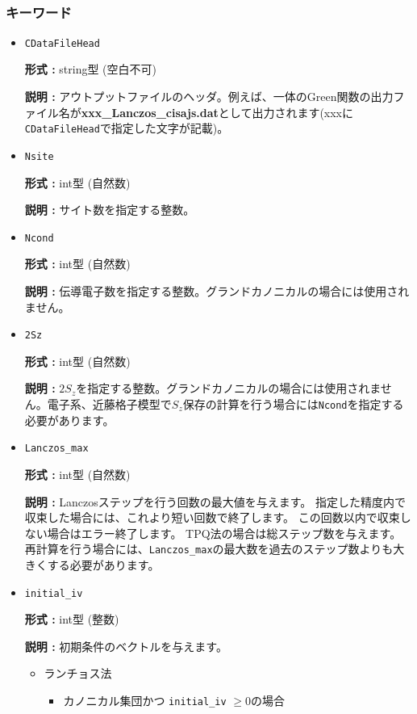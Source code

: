 ~\subsubsection{キーワード}
 \begin{itemize}
  \item  \verb|CDataFileHead|

 {\bf 形式 :} string型 (空白不可)

{\bf 説明 :} アウトプットファイルのヘッダ。例えば、一体のGreen関数の出力ファイル名が{\bf xxx\_Lanczos\_cisajs.dat}として出力されます(xxxに\verb|CDataFileHead|で指定した文字が記載)。
   
 \item  \verb|Nsite|

{\bf 形式 :} int型 (自然数)

{\bf 説明 :} サイト数を指定する整数。  

\item  \verb|Ncond|

{\bf 形式 :} {int型 (自然数)}

{\bf 説明 :} {伝導電子数を指定する整数。グランドカノニカルの場合には使用されません。}

 \item  \verb|2Sz|

{\bf 形式 :} {int型 (自然数)}

{\bf 説明 :} {$2S_z$を指定する整数。グランドカノニカルの場合には使用されません。電子系、近藤格子模型で$S_z$保存の計算を行う場合には}\verb|Ncond|を指定する必要があります。

 \item  \verb|Lanczos_max|

{\bf 形式 :} int型 (自然数)

{\bf 説明 :}  Lanczosステップを行う回数の最大値を与えます。
指定した精度内で収束した場合には、これより短い回数で終了します。
この回数以内で収束しない場合はエラー終了します。
TPQ法の場合は総ステップ数を与えます。
再計算を行う場合には、\verb|Lanczos_max|の最大数を過去のステップ数よりも大きくする必要があります。

 \item  \verb|initial_iv|

{\bf 形式 :} int型 (整数)

{\bf 説明 :} 
 {初期条件のベクトルを与えます。}
\begin{itemize}
\item{ランチョス法}
\begin{itemize}
\item{カノニカル集団かつ \verb|initial_iv| $\geq 0$の場合}


\end{itemize}
\end{itemize}
\end{itemize}
